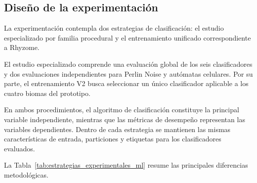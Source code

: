 \subsection{Diseño de la experimentación}
\label{subsec:diseno_experimentacion}
\label{subsec:entrenamiento_modelos_familia}

La experimentación contempla dos estrategias de clasificación: el estudio especializado por familia procedural y el entrenamiento unificado correspondiente a Rhyzome.

El estudio especializado comprende una evaluación global de los seis clasificadores y dos evaluaciones independientes para Perlin Noise y autómatas celulares. Por su parte, el entrenamiento V2 busca seleccionar un único clasificador aplicable a los cuatro biomas del prototipo.

En ambos procedimientos, el algoritmo de clasificación constituye la principal variable independiente, mientras que las métricas de desempeño representan las variables dependientes. Dentro de cada estrategia se mantienen las mismas características de entrada, particiones y etiquetas para los clasificadores
evaluados.

La Tabla~\ref{tab:estrategias_experimentales_ml} resume las principales diferencias metodológicas.

